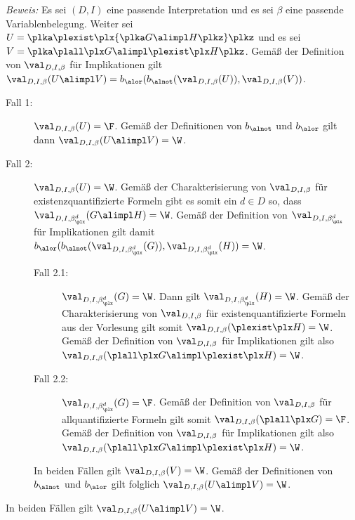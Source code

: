 \documentclass[12pt]{article}
\begin{document}
\begin{loesung}
  \emph{Beweis:}
  Es sei $(D, I)$ eine passende Interpretation und es sei $\beta$ eine passende Variablenbelegung. Weiter sei $U = \plka \plexist \plx {\plka G \alimpl H \plkz} \plkz$ und es sei $V = \plka \plall \plx G \alimpl \plexist \plx H \plkz$. Gemäß der Definition von $\val_{D,I,\beta}$ für Implikationen gilt $\val_{D,I,\beta}(U \alimpl V) = b_{\alor}(b_{\alnot}(\val_{D,I,\beta}(U)), \val_{D,I,\beta}(V))$.
  \begin{description}
    \item[Fall 1:] $\val_{D,I,\beta}(U) = \F$. Gemäß der Definitionen von $b_{\alnot}$ und $b_{\alor}$ gilt dann $\val_{D,I,\beta}(U \alimpl V) = \W$.
    \item[Fall 2:] $\val_{D, I, \beta}(U) = \W$. Gemäß der Charakterisierung von $\val_{D, I, \beta}$ für existenzquantifizierte Formeln gibt es somit ein $d \in D$ so, dass $\val_{D, I, \beta_{\plx}^d}(G \alimpl H) = \W$. Gemäß der Definition von $\val_{D, I, \beta_{\plx}^d}$ für Implikationen gilt damit $b_{\alor}(b_{\alnot}(\val_{D, I, \beta_{\plx}^d}(G)), \val_{D, I, \beta_{\plx}^d}(H)) = \W$.
                   \begin{description}
                     \item[Fall 2.1:] $\val_{D, I, \beta_{\plx}^d}(G) = \W$. Dann gilt $\val_{D, I, \beta_{\plx}^d}(H) = \W$. Gemäß der Charakterisierung von $\val_{D, I, \beta}$ für existenquantifizierte Formeln aus der Vorlesung gilt somit $\val_{D, I, \beta}(\plexist \plx H) = \W$. Gemäß der Definition von $\val_{D, I, \beta}$ für Implikationen gilt also $\val_{D, I, \beta}(\plall \plx G \alimpl \plexist \plx H) = \W$.
                     \item[Fall 2.2:] $\val_{D, I, \beta_{\plx}^d}(G) = \F$. Gemäß der Definition von $\val_{D, I, \beta}$ für allquantifizierte Formeln gilt somit $\val_{D, I, \beta}(\plall \plx G) = \F$. Gemäß der Definition von $\val_{D, I, \beta}$ für Implikationen gilt also $\val_{D, I, \beta}(\plall \plx G \alimpl \plexist \plx H) = \W$.
                   \end{description}
                   In beiden Fällen gilt $\val_{D, I, \beta}(V) = \W$. Gemäß der Definitionen von $b_{\alnot}$ und $b_{\alor}$ gilt folglich $\val_{D,I,\beta}(U \alimpl V) = \W$.
  \end{description}
  In beiden Fällen gilt $\val_{D,I,\beta}(U \alimpl V) = \W$.
\end{loesung}

\end{document}
